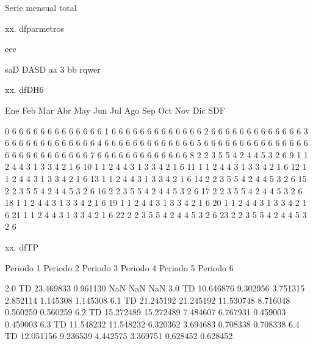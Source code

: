 \documentclass[a4paper,10pt,twocolumn]{article}
\begin{document}
\begin{Form}
\begin{table}[H]
{                        }
                        \caption{Serie mensual total}
                    \end{table}
                    

xx. dfparmetros

       eee
          
saD   DASD
aa       3
bb   rqwer

xx. dfDH6

    Ene  Feb  Mar  Abr  May  Jun  Jul  Ago  Sep  Oct  Nov  Dic  SDF
                                                                   
0     6    6    6    6    6    6    6    6    6    6    6    6    6
1     6    6    6    6    6    6    6    6    6    6    6    6    6
2     6    6    6    6    6    6    6    6    6    6    6    6    6
3     6    6    6    6    6    6    6    6    6    6    6    6    6
4     6    6    6    6    6    6    6    6    6    6    6    6    6
5     6    6    6    6    6    6    6    6    6    6    6    6    6
6     6    6    6    6    6    6    6    6    6    6    6    6    6
7     6    6    6    6    6    6    6    6    6    6    6    6    6
8     2    2    3    5    5    4    2    4    4    5    3    2    6
9     1    1    2    4    4    3    1    3    3    4    2    1    6
10    1    1    2    4    4    3    1    3    3    4    2    1    6
11    1    1    2    4    4    3    1    3    3    4    2    1    6
12    1    1    2    4    4    3    1    3    3    4    2    1    6
13    1    1    2    4    4    3    1    3    3    4    2    1    6
14    2    2    3    5    5    4    2    4    4    5    3    2    6
15    2    2    3    5    5    4    2    4    4    5    3    2    6
16    2    2    3    5    5    4    2    4    4    5    3    2    6
17    2    2    3    5    5    4    2    4    4    5    3    2    6
18    1    1    2    4    4    3    1    3    3    4    2    1    6
19    1    1    2    4    4    3    1    3    3    4    2    1    6
20    1    1    2    4    4    3    1    3    3    4    2    1    6
21    1    1    2    4    4    3    1    3    3    4    2    1    6
22    2    2    3    5    5    4    2    4    4    5    3    2    6
23    2    2    3    5    5    4    2    4    4    5    3    2    6

xx. dfTP

        Periodo 1  Periodo 2  Periodo 3  Periodo 4  Periodo 5 Periodo 6
                                                                       
2.0 TD  23.469833   0.961130        NaN        NaN        NaN          
3.0 TD  10.646876   9.302956   3.751315   2.852114   1.145308  1.145308
6.1 TD  21.245192  21.245192  11.530748   8.716048   0.560259  0.560259
6.2 TD  15.272489  15.272489   7.484607   6.767931   0.459003  0.459003
6.3 TD  11.548232  11.548232   6.320362   3.694683   0.708338  0.708338
6.4 TD  12.051156   9.236539   4.442575   3.369751   0.628452  0.628452


\end{Form}
\end{document}
